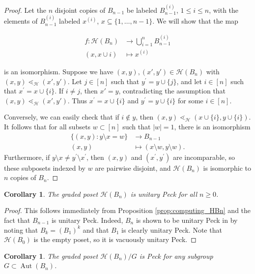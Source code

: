 \documentclass[smallextended, envcountsame, numbook]{svjour3}
\theoremstyle{plain}
\newtheorem{cor}[thm]{Corollary}
\theoremstyle{definition}
\theoremstyle{remark}
\numberwithin{equation}{section}
\newcommand\Aut{\operatorname{Aut}}
\begin{document}
\begin{proof}
Let the $n$ disjoint copies of $B_{n-1}$ be labeled $B_{n-1}^{(i)}$, $1\le i\le n$, with the elements of $B_{n-1}^{(i)}$ labeled $x^{(i)}$, $x\subseteq \{1,\ldots,n-1\}$.  We will show that the map 

\begin{align*}
f\colon \mathcal{H}(B_n) &\longrightarrow \bigcup_{i=1}^n B_{n-1}^{(i)}\\
(x,x\cup{i})&\longmapsto x^{(i)}
\end{align*}

\noindent is an isomorphism.  Suppose we have $(x, y),(x', y') \in \mathcal H(B_n)$ with $(x, y) \lessdot_{\mathcal H} (x', y')$. Let $j\in [n]$ such that $y^\prime = y\cup\{j\}$, and let $i\in [n]$ such that $x^\prime = x\cup \{i\}$. If $i \ne j$, then $x' = y$, contradicting the assumption that $(x, y) \lessdot_{\mathcal H} (x', y')$. Thus $x^\prime = x\cup\{i\}$ and $y^\prime = y\cup\{i\}$ for some $i\in [n]$.

Conversely, we can easily check that if $i\not\in y$, then $(x, y)\lessdot_{\mathcal{H}} (x\cup\{i\}, y\cup\{i\})$.  It follows that for all subsets $w \subset [n]$ such that $|w| = 1$, there is an isomorphism 
\begin{align*}
\{(x, y)\colon y\setminus x = w\} & \rightarrow B_{n-1}\\
(x,y) &\mapsto (x\setminus w,y\setminus w). 
\end{align*}
Furthermore, if $y\setminus x \ne y^\prime \setminus x^\prime$, then $(x, y)$ and $(x^\prime, y^\prime)$ are incomparable, so these subposets indexed by $w$ are pairwise disjoint, and $\mathcal H(B_n)$ is isomorphic to $n$ copies of $B_{n}$.
\end{proof}

\begin{cor}\label{cor:HBn_unitary_peck}
The graded poset 
$\mathcal H(B_n)$ is unitary Peck for all $n\ge 0$.
\end{cor}

\begin{proof}
This follows immediately from Proposition \ref{prop:computing_HBn} and the fact that $B_{n-1}$ is unitary Peck.  Indeed, $B_n$ is shown to be unitary Peck in \cite[Theorem 2a]{quotients_stanley} by noting that $B_k = (B_1)^k$ and that $B_1$ is clearly unitary Peck.
Note that $\mathcal H(B_0)$ is the empty poset, so it is vacuously unitary Peck.
\end{proof}

\begin{cor}\label{cor:quotients_of_HBn_peck}
The graded poset $\mathcal H(B_n)/G$ is Peck for any subgroup $G\subset \Aut(B_n)$.
\end{cor}
\end{document}
